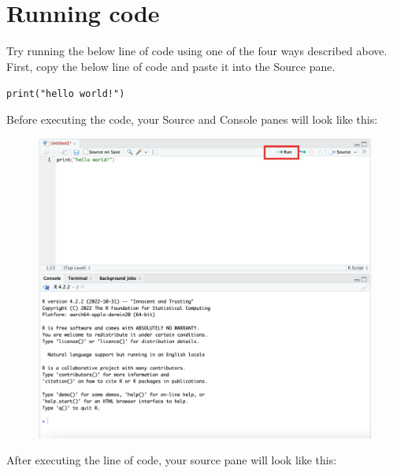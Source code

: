 \documentclass[
  letterpaper,
  DIV=11,
  numbers=noendperiod]{scrreprt}
\begin{document}
\hypertarget{running-code}{%
\section{Running code}\label{running-code}}

Try running the below line of code using one of the four ways described
above. First, copy the below line of code and paste it into the Source
pane.

\texttt{print("hello\ world!")}

Before executing the code, your Source and Console panes will look like
this:

\begin{figure}

{\centering \includegraphics{scripts/00_intro/class0_images/Picture4.png}

}

\end{figure}

After executing the line of code, your source pane will look like this:
\end{document}
